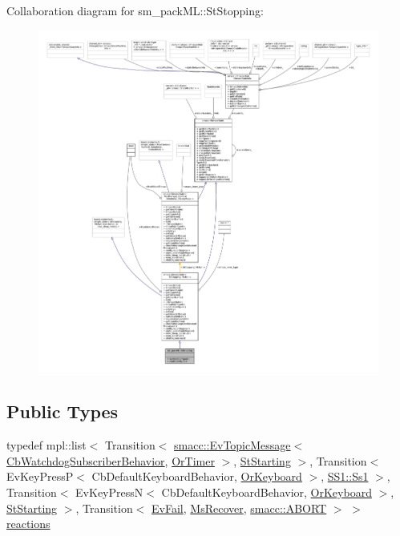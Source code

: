 Collaboration diagram for sm\+\_\+pack\+ML\+:\+:St\+Stopping\+:
\nopagebreak
\begin{figure}[H]
\begin{center}
\leavevmode
\includegraphics[width=350pt]{structsm__packML_1_1StStopping__coll__graph}
\end{center}
\end{figure}
\subsection*{Public Types}
\begin{DoxyCompactItemize}
\item 
typedef mpl\+::list$<$ Transition$<$ \hyperlink{structsmacc_1_1default__events_1_1EvTopicMessage}{smacc\+::\+Ev\+Topic\+Message}$<$ \hyperlink{classsm__packML_1_1cl__subscriber_1_1CbWatchdogSubscriberBehavior}{Cb\+Watchdog\+Subscriber\+Behavior}, \hyperlink{classsm__packML_1_1OrTimer}{Or\+Timer} $>$, \hyperlink{structsm__packML_1_1StStarting}{St\+Starting} $>$, Transition$<$ Ev\+Key\+PressP$<$ Cb\+Default\+Keyboard\+Behavior, \hyperlink{classsm__packML_1_1OrKeyboard}{Or\+Keyboard} $>$, \hyperlink{structsm__packML_1_1SS1_1_1Ss1}{S\+S1\+::\+Ss1} $>$, Transition$<$ Ev\+Key\+PressN$<$ Cb\+Default\+Keyboard\+Behavior, \hyperlink{classsm__packML_1_1OrKeyboard}{Or\+Keyboard} $>$, \hyperlink{structsm__packML_1_1StStarting}{St\+Starting} $>$, Transition$<$ \hyperlink{structsm__packML_1_1EvFail}{Ev\+Fail}, \hyperlink{classsm__packML_1_1MsRecover}{Ms\+Recover}, \hyperlink{structsmacc_1_1default__transition__tags_1_1ABORT}{smacc\+::\+A\+B\+O\+RT} $>$ $>$ \hyperlink{structsm__packML_1_1StStopping_acacdf1faa8c79729b1d2725500858853}{reactions}
\end{DoxyCompactItemize}
